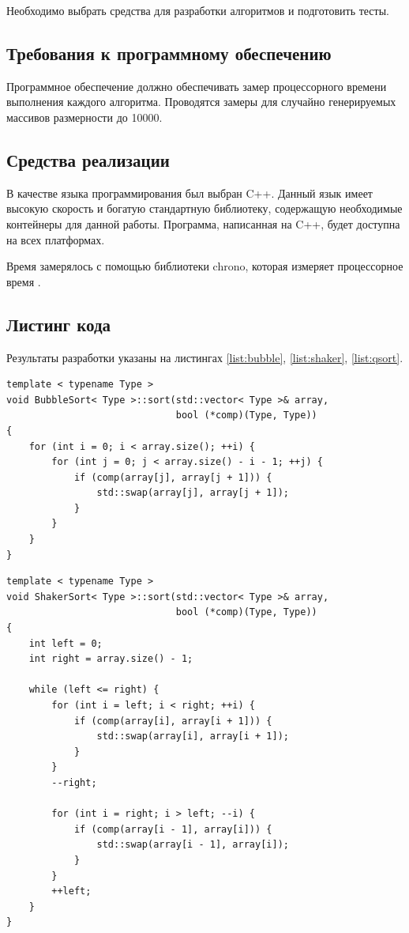 \documentclass[a4paper,12pt]{article}
\begin{document}
Необходимо выбрать средства для разработки алгоритмов и подготовить тесты.

\subsection{Требования к программному обеспечению}

Программное обеспечение должно обеспечивать замер процессорного времени выполнения каждого
алгоритма. Проводятся замеры для случайно генерируемых массивов размерности до 10000.

\subsection{Средства реализации}

В качестве языка программирования был выбран C++. Данный язык имеет высокую скорость и
богатую стандартную библиотеку, содержащую необходимые контейнеры для данной работы.
Программа, написанная на C++, будет доступна на всех платформах.

Время замерялось с помощью библиотеки chrono, которая измеряет процессорное
время \cite{chrono}.

\subsection{Листинг кода}

Результаты разработки указаны на листингах \ref{list:bubble}, \ref{list:shaker},
\ref{list:qsort}.

\begin{lstlisting}[caption=Сортировка пузырьком,label=list:bubble]
template < typename Type >
void BubbleSort< Type >::sort(std::vector< Type >& array,
                              bool (*comp)(Type, Type))
{
    for (int i = 0; i < array.size(); ++i) {
        for (int j = 0; j < array.size() - i - 1; ++j) {
            if (comp(array[j], array[j + 1])) {
                std::swap(array[j], array[j + 1]);
            }
        }
    }
}
\end{lstlisting}

\begin{lstlisting}[caption=Сортировка шейкером,label=list:shaker]
template < typename Type >
void ShakerSort< Type >::sort(std::vector< Type >& array,
                              bool (*comp)(Type, Type))
{
    int left = 0;
    int right = array.size() - 1;

    while (left <= right) {
        for (int i = left; i < right; ++i) {
            if (comp(array[i], array[i + 1])) {
                std::swap(array[i], array[i + 1]);
            }
        }
        --right;

        for (int i = right; i > left; --i) {
            if (comp(array[i - 1], array[i])) {
                std::swap(array[i - 1], array[i]);
            }
        }
        ++left;
    }
}
\end{lstlisting}
\end{document}
